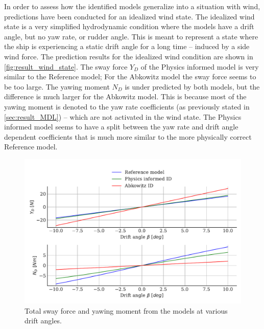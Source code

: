In order to assess how the identified models generalize into a situation with wind, predictions have been conducted for an idealized wind state. The idealized wind state is a very simplified hydrodynamic condition where the models have a drift angle, but no yaw rate, or rudder angle. This is meant to represent a state where the ship is experiencing a static drift angle for a long time -- induced by a side wind force.
The prediction results for the idealized wind condition are shown in \autoref{fig:result_wind_state}. The sway force $Y_D$ of the Physics informed model is very similar to the Reference model; For the Abkowitz model the sway force seems to be too large. The yawing moment $N_D$ is under predicted by both models, but the difference is much larger for the Abkowitz model. 
This is because most of the yawing moment is denoted to the yaw rate coefficients (as previously stated in \autoref{sec:result_MDL}) -- which are not activated in the wind state. 
The Physics informed model seems to have a split between the yaw rate and drift angle dependent coefficients that is much more similar to the more physically correct Reference model.
\label{sec:wind_state}
\begin{figure}[h!]
    \includegraphics[width=\columnwidth]{figures/result_wind_state.forces.pdf}
    \caption{Total sway force and yawing moment from the models at various drift angles.}
    \label{fig:result_wind_state}
\end{figure}